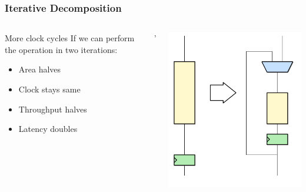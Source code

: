 \documentclass[compress]{beamer}
\begin{document}
\begin{frame}
	\frametitle{Iterative Decomposition}
	\begin{columns}
		
		\begin{block}{More clock cycles}
			If we can perform the
			operation in two iterations:
			\begin{itemize}
				\item Area halves
				\item Clock stays same
				\item Throughput halves
				\item Latency doubles
			\end{itemize}
		\end{block}'
		\begin{center}
			\includegraphics[width=0.7 \textwidth]{deco}
		\end{center}	
	\end{columns}
\end{frame}
\end{document}
